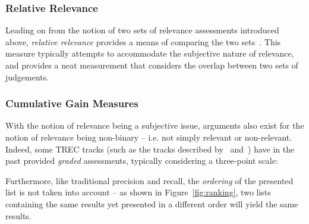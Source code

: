 \subsubsection{Relative Relevance}
Leading on from the notion of two sets of relevance assessments introduced above, \emph{relative relevance} provides a means of comparing the two sets~\citep{borlund1997iir_evaluation}. This measure typically attempts to accommodate the subjective nature of relevance, and provides a neat measurement that considers the overlap between two sets of judgements. 

\subsubsection{Cumulative Gain Measures}
With the notion of relevance being a subjective issue, arguments also exist for the notion of relevance being non-binary -- i.e. not simply relevant or non-relevant. Indeed, some TREC tracks (such as the tracks described by~\cite{sormunen2002relevance} and~\cite{voorhees2004trec}) have in the past provided \emph{graded} assessments, typically considering a three-point scale:

\vspace{5mm}
\begin{figure}[h!]
    \centering
    \label{fig:graded}
\end{figure}

Furthermore, like traditional precision and recall, the \emph{ordering} of the presented list is not taken into account -- as shown in Figure~\ref{fig:ranking}, two lists containing the same results yet presented in a different order will yield the same results.

